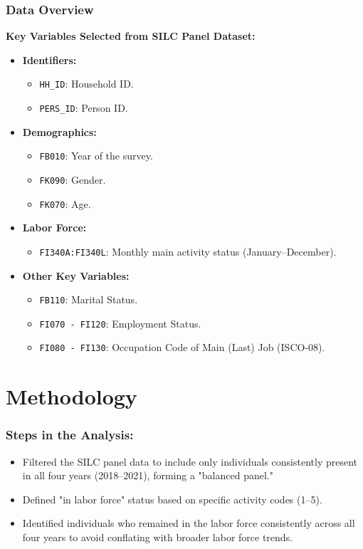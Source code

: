 \documentclass[
	11pt, %
]{beamer}
\begin{document}
\begin{frame}

    \frametitle{Data Overview}
     \textbf{Key Variables Selected from SILC Panel Dataset:}
    \begin{itemize}
        \item \textbf{Identifiers:} 
        \begin{itemize}
            \item \texttt{HH\_ID}: Household ID.
            \item \texttt{PERS\_ID}: Person ID.
        \end{itemize}
        \item \textbf{Demographics:} 
        \begin{itemize}
            \item \texttt{FB010}: Year of the survey.
            \item \texttt{FK090}: Gender.
            \item \texttt{FK070}: Age.
        \end{itemize}
        \item \textbf{Labor Force:}
        \begin{itemize}
            \item \texttt{FI340A:FI340L}: Monthly main activity status (January–December).
        \end{itemize}
        \item \textbf{Other Key Variables:}
        \begin{itemize}
            \item \texttt{FB110}: Marital Status.
            \item \texttt{FI070 - FI120}: Employment Status.
            \item \texttt{FI080 - FI130}: Occupation Code of Main (Last) Job (ISCO-08).

        \end{itemize}
    \end{itemize}
   
\end{frame}

\section{Methodology}

\begin{frame}
    \frametitle{Steps in the Analysis:}
     \begin{itemize}
        \item Filtered the SILC panel data to include only individuals consistently present in all four years (2018–2021), forming a "balanced panel."
        \item Defined "in labor force" status based on specific activity codes (1--5).
        \item Identified individuals who remained in the labor force consistently across all four years to avoid conflating with broader labor force trends.
    \end{itemize}
    
\end{frame}
\end{document}
